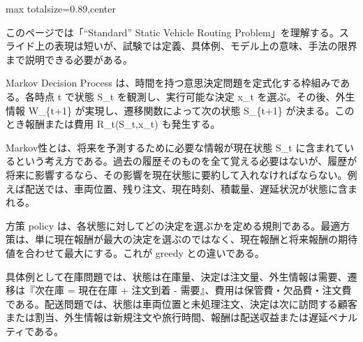 \begin{minipage}[t]{0.58\textwidth}
\begin{adjustbox}{max totalsize={\textwidth}{0.89\textheight},center}
\begin{minipage}{\textwidth}\scriptsize
{}このページでは「“Standard” Static Vehicle Routing Problem」を理解する。スライド上の表現は短いが、試験では定義、具体例、モデル上の意味、手法の限界まで説明できる必要がある。\par
Markov Decision Process は、時間を持つ意思決定問題を定式化する枠組みである。各時点 t で状態 S\_t を観測し、実行可能な決定 x\_t を選ぶ。その後、外生情報 W\_\{t+1\} が実現し、遷移関数によって次の状態 S\_\{t+1\} が決まる。このとき報酬または費用 R\_t(S\_t,x\_t) も発生する。\par
Markov性とは、将来を予測するために必要な情報が現在状態 S\_t に含まれているという考え方である。過去の履歴そのものを全て覚える必要はないが、履歴が将来に影響するなら、その影響を現在状態に要約して入れなければならない。例えば配送では、車両位置、残り注文、現在時刻、積載量、遅延状況が状態に含まれる。\par
方策 policy は、各状態に対してどの決定を選ぶかを定める規則である。最適方策は、単に現在報酬が最大の決定を選ぶのではなく、現在報酬と将来報酬の期待値を合わせて最大にする。これが greedy との違いである。\par
具体例として在庫問題では、状態は在庫量、決定は注文量、外生情報は需要、遷移は『次在庫 = 現在在庫 + 注文到着 - 需要』、費用は保管費・欠品費・注文費である。配送問題では、状態は車両位置と未処理注文、決定は次に訪問する顧客または割当、外生情報は新規注文や旅行時間、報酬は配送収益または遅延ペナルティである。\par

\end{minipage}
\end{adjustbox}
\end{minipage}
